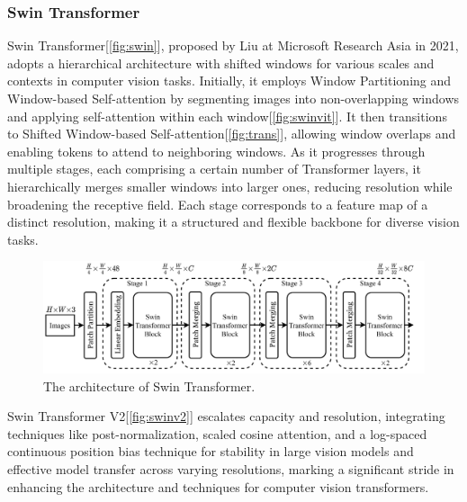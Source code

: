 \documentclass[10pt,twocolumn,letterpaper]{article}
\begin{document}
\subsubsection{Swin Transformer}
Swin Transformer[\ref{fig:swin}], proposed by Liu \etal\cite{liu2021swin} at Microsoft Research Asia in 2021, adopts a hierarchical architecture with shifted windows for various scales and contexts in computer vision tasks. Initially, it employs Window Partitioning and Window-based Self-attention by segmenting images into non-overlapping windows and applying self-attention within each window\cite{liu2021swin, dosovitskiy2020image}[\ref{fig:swinvit}]. It then transitions to Shifted Window-based Self-attention\cite{vaswani2017attention}[\ref{fig:trans}], allowing window overlaps and enabling tokens to attend to neighboring windows. As it progresses through multiple stages, each comprising a certain number of Transformer layers, it hierarchically merges smaller windows into larger ones, reducing resolution while broadening the receptive field. Each stage corresponds to a feature map of a distinct resolution, making it a structured and flexible backbone for diverse vision tasks.
\begin{figure}[h]
	\centering
	\includegraphics[width=\columnwidth]{swin}
	\caption{The architecture of Swin Transformer\cite{liu2021swin}.}
	\label{fig:swinm}
\end{figure}

Swin Transformer V2\cite{liu2022swin, liu2021swin}[\ref{fig:swinv2}] escalates capacity and resolution, integrating techniques like post-normalization, scaled cosine attention, and a log-spaced continuous position bias technique for stability in large vision models and effective model transfer across varying resolutions, marking a significant stride in enhancing the architecture and techniques for computer vision transformers.
\end{document}
